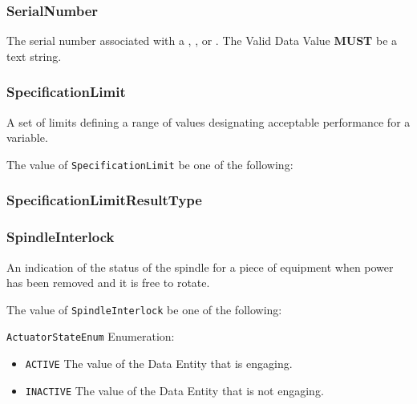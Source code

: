 \subsubsection{SerialNumber}
\label{sec:SerialNumber}



The serial number associated with a , , or . The \gls{Valid Data Value} \textbf{MUST} be a text string.


\subsubsection{SpecificationLimit}
\label{sec:SpecificationLimit}



A set of limits defining a range of values designating acceptable performance for a variable.


The value of \texttt{SpecificationLimit} \MUST be one of the following: 

\FloatBarrier

\subsubsection{SpecificationLimitResultType}
\label{sec:SpecificationLimitResultType}






\subsubsection{SpindleInterlock}
\label{sec:SpindleInterlock}



An indication of the status of the spindle for a piece of equipment when power has been removed and it is free to rotate.


The value of \texttt{SpindleInterlock} \MUST be one of the following: 


\texttt{ActuatorStateEnum} Enumeration:

\begin{itemize}
\item \texttt{ACTIVE} \newline The value of the \gls{Data Entity} that is engaging. 
\item \texttt{INACTIVE} \newline The value of the \gls{Data Entity} that is not engaging. 
\end{itemize}


